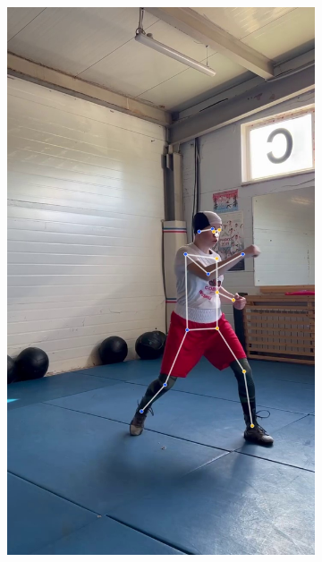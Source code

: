 \begin{figure}[h]
\begin{subfigure}[b]{0.24\textwidth}
	\includegraphics[width=\textwidth]{./images/experiment/data_info/box_examples/ex_9}
\end{subfigure}
\begin{subfigure}[b]{0.24\textwidth}
	\centering

\end{subfigure}
\end{figure}
